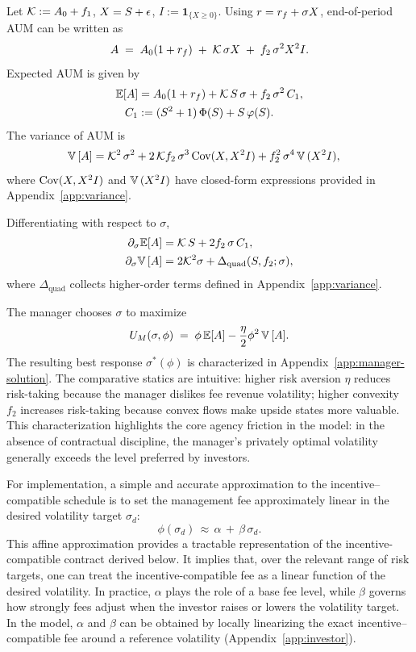 Let $\mathcal{K}:=A_0+f_1$, $X=S+\epsilon$, $I:=\mathbf{1}_{\{X\ge 0\}}$. Using $r=r_f+\sigma X$, end-of-period AUM can be written as
\begin{equation}
A \;=\; A_0(1+r_f) \;+\; \mathcal{K}\,\sigma X \;+\; f_2\,\sigma^2 X^2 I.
\end{equation}
Expected AUM is given by
\begin{align}
\mathbb{E}[A] &= A_0(1+r_f) + \mathcal{K}\,S\,\sigma + f_2\,\sigma^2\,C_1, \label{eq:EA}\\
C_1 &:= (S^2+1)\,\Phi(S) + S\,\varphi(S). \label{eq:C1}
\end{align}
The variance of AUM is
\begin{align}
{\mathbb{V}}\,[A] &= \mathcal{K}^2\,\sigma^2 + 2\,\mathcal{K} f_2\,\sigma^3\,{\mathrm{Cov}}(X, X^2 I) + f_2^2\,\sigma^4\,{\mathbb{V}}\,(X^2 I), \label{eq:VarA}
\end{align}
where ${\mathrm{Cov}}(X, X^2 I)$ and ${\mathbb{V}}\,(X^2 I)$ have closed-form expressions provided in Appendix~\ref{app:variance}.

Differentiating with respect to $\sigma$,
\begin{align}
\partial_\sigma \mathbb{E}[A] &= \mathcal{K}\,S + 2 f_2\,\sigma\,C_1, \label{eq:dEA}\\
\partial_\sigma {\mathbb{V}}\,[A] &= 2\mathcal{K}^2\sigma + \Delta_{\text{quad}}(S,f_2;\sigma), \label{eq:dVarA}
\end{align}
where $\Delta_{\text{quad}}$ collects higher-order terms defined in Appendix~\ref{app:variance}.

The manager chooses \(\sigma\) to maximize
\[
U_M(\sigma,\phi)\;=\;\phi\,\mathbb{E}[A] - \frac{\eta}{2}\phi^2\,{\mathbb{V}}\,[A].
\]
The resulting best response $\sigma^*(\phi)$ is characterized in Appendix~\ref{app:manager-solution}. The comparative statics are intuitive: higher risk aversion $\eta$ reduces risk-taking because the manager dislikes fee revenue volatility; higher convexity $f_2$ increases risk-taking because convex flows make upside states more valuable. This characterization highlights the core agency friction in the model: in the absence of contractual discipline, the manager's privately optimal volatility generally exceeds the level preferred by investors.

For implementation, a simple and accurate approximation to the incentive--compatible schedule is to set the management fee approximately linear in the desired volatility target $\sigma_d$:
\begin{equation}
\label{eq:phi-linear-approx}
\phi(\sigma_d) \,\approx\, \alpha \, + \, \beta\,\sigma_d.
\end{equation}
This affine approximation provides a tractable representation of the incentive-compatible contract derived below. It implies that, over the relevant range of risk targets, one can treat the incentive-compatible fee as a linear function of the desired volatility. In practice, $\alpha$ plays the role of a base fee level, while $\beta$ governs how strongly fees adjust when the investor raises or lowers the volatility target. In the model, $\alpha$ and $\beta$ can be obtained by locally linearizing the exact incentive--compatible fee around a reference volatility (Appendix~\ref{app:investor}).



